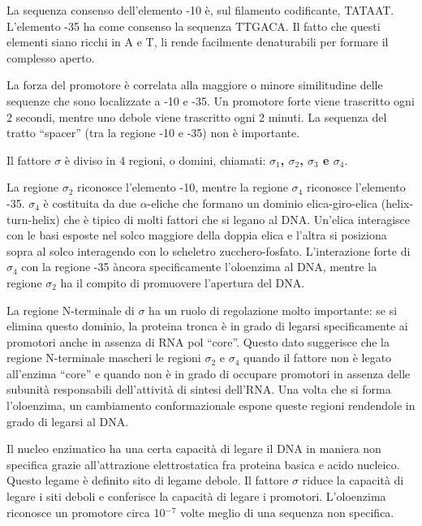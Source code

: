 \documentclass[]{article}
\begin{document}
La sequenza consenso dell'elemento -10 è, sul filamento codificante,
TATAAT. L'elemento -35 ha come consenso la sequenza TTGACA. Il fatto che
questi elementi siano ricchi in A e T, li rende facilmente denaturabili
per formare il complesso aperto.

La forza del promotore è correlata alla maggiore o minore similitudine
delle sequenze che sono localizzate a -10 e -35. Un promotore forte
viene trascritto ogni 2 secondi, mentre uno debole viene trascritto ogni
2 minuti. La sequenza del tratto ``spacer'' (tra la regione -10 e -35)
non è importante.

Il fattore \(\sigma\) è diviso in 4 regioni, o domini, chiamati:
\textbf{\(\sigma\)\(_1\), \(\sigma\)\(_2\), \(\sigma\)\(_3\) e
\(\sigma\)\(_4\)}.

La regione \(\sigma\)\(_2\) riconosce l'elemento -10, mentre la regione
\(\sigma\)\(_4\) riconosce l'elemento -35. \(\sigma\)\(_4\) è costituita
da due \(\alpha\)-eliche che formano un dominio elica-giro-elica
(helix-turn-helix) che è tipico di molti fattori che si legano al DNA.
Un'elica interagisce con le basi esposte nel solco maggiore della doppia
elica e l'altra si posiziona sopra al solco interagendo con lo scheletro
zucchero-fosfato. L'interazione forte di \(\sigma\)\(_4\) con la regione
-35 àncora specificamente l'oloenzima al DNA, mentre la regione
\(\sigma\)\(_2\) ha il compito di promuovere l'apertura del DNA.

La regione N-terminale di \(\sigma\) ha un ruolo di regolazione molto
importante: se si elimina questo dominio, la proteina tronca è in grado
di legarsi specificamente ai promotori anche in assenza di RNA pol
``core''. Questo dato suggerisce che la regione N-terminale mascheri le
regioni \(\sigma\)\(_2\) e \(\sigma\)\(_4\) quando il fattore non è
legato all'enzima ``core'' e quando non è in grado di occupare promotori
in assenza delle subunità responsabili dell'attività di sintesi
dell'RNA. Una volta che si forma l'oloenzima, un cambiamento
conformazionale espone queste regioni rendendole in grado di legarsi al
DNA.

Il nucleo enzimatico ha una certa capacità di legare il DNA in maniera
non specifica grazie all'attrazione elettrostatica fra proteina basica e
acido nucleico. Questo legame è definito sito di legame debole. Il
fattore \(\sigma\) riduce la capacità di legare i siti deboli e
conferisce la capacità di legare i promotori. L'oloenzima riconosce un
promotore circa 10\(^-\)\(^7\) volte meglio di una sequenza non
specifica.
\end{document}
